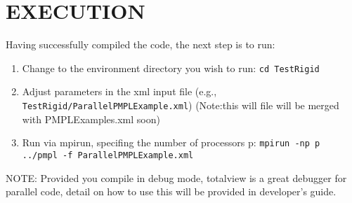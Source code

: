 \documentclass[12pt]{article}
\begin{document}

\section{EXECUTION}
Having successfully compiled the code, the next step is to run:
\begin{enumerate}
\item Change to the environment directory you wish to run: {\tt cd TestRigid}
\item Adjust parameters in the xml input file (e.g., {\tt TestRigid/ParallelPMPLExample.xml})  (Note:this will file will be merged with PMPLExamples.xml soon)
\item Run via mpirun, specifing the number of processors p: {\tt mpirun -np p ../pmpl -f ParallelPMPLExample.xml}
\end{enumerate}
NOTE: Provided you compile in debug mode, totalview is a great debugger for parallel code, detail on how
to use this will be provided in developer's guide.
\end{document}

